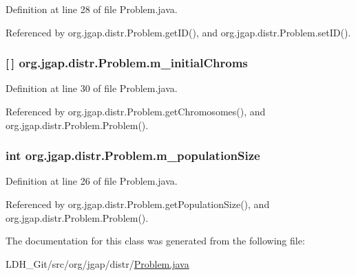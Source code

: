 Definition at line 28 of file Problem.\-java.



Referenced by org.\-jgap.\-distr.\-Problem.\-get\-I\-D(), and org.\-jgap.\-distr.\-Problem.\-set\-I\-D().

\hypertarget{classorg_1_1jgap_1_1distr_1_1_problem_aac1154b8050ba9052ad4ab0995c405df}{
\subsubsection[{m\-\_\-initial\-Chroms}]{ \mbox{[}$\,$\mbox{]} org.\-jgap.\-distr.\-Problem.\-m\-\_\-initial\-Chroms\hspace{0.3cm}{\ttfamily [private]}}}\label{classorg_1_1jgap_1_1distr_1_1_problem_aac1154b8050ba9052ad4ab0995c405df}


Definition at line 30 of file Problem.\-java.



Referenced by org.\-jgap.\-distr.\-Problem.\-get\-Chromosomes(), and org.\-jgap.\-distr.\-Problem.\-Problem().

\hypertarget{classorg_1_1jgap_1_1distr_1_1_problem_a8805c7b69b526f55e738835f7a0405dc}{
\subsubsection[{m\-\_\-population\-Size}]{\setlength{\rightskip}{0pt plus 5cm}int org.\-jgap.\-distr.\-Problem.\-m\-\_\-population\-Size\hspace{0.3cm}{\ttfamily [private]}}}\label{classorg_1_1jgap_1_1distr_1_1_problem_a8805c7b69b526f55e738835f7a0405dc}


Definition at line 26 of file Problem.\-java.



Referenced by org.\-jgap.\-distr.\-Problem.\-get\-Population\-Size(), and org.\-jgap.\-distr.\-Problem.\-Problem().



The documentation for this class was generated from the following file\-:\begin{DoxyCompactItemize}
\item 
L\-D\-H\-\_\-\-Git/src/org/jgap/distr/\hyperlink{_problem_8java}{Problem.\-java}\end{DoxyCompactItemize}
